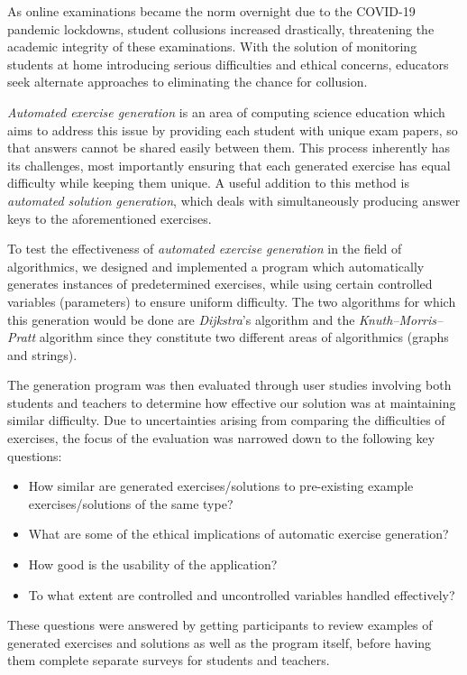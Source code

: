 \documentclass{l4proj}
\begin{document}
As online examinations became the norm overnight due to the COVID-19 pandemic lockdowns, student collusions increased drastically, threatening the academic integrity of these examinations. With the solution of monitoring students at home introducing serious difficulties and ethical concerns, educators seek alternate approaches to eliminating the chance for collusion.

\emph{Automated exercise generation} is an area of computing science education which aims to address this issue by providing each student with unique exam papers, so that answers cannot be shared easily between them. This process inherently has its challenges, most importantly ensuring that each generated exercise has equal difficulty while keeping them unique. A useful addition to this method is \emph{automated solution generation}, which deals with simultaneously producing answer keys to the aforementioned exercises.

To test the effectiveness of \emph{automated exercise generation} in the field of algorithmics, we designed and implemented a program which automatically generates instances of predetermined exercises, while using certain controlled variables (parameters) to ensure uniform difficulty. The two algorithms for which this generation would be done are \emph{Dijkstra}'s algorithm and the \emph{Knuth–Morris–Pratt} algorithm since they constitute two different areas of algorithmics (graphs and strings).

The generation program was then evaluated through user studies involving both students and teachers to determine how effective our solution was at maintaining similar difficulty. Due to uncertainties arising from comparing the difficulties of exercises, the focus of the evaluation was narrowed down to the following key questions:

\begin{itemize}
	\item
	How similar are generated exercises/solutions to pre-existing example exercises/solutions of the same type?
	\item
	What are some of the ethical implications of automatic exercise generation?
	\item
	How good is the usability of the application?
	\item
	To what extent are controlled and uncontrolled variables handled effectively?
\end{itemize}

These questions were answered by getting participants to review examples of generated exercises and solutions as well as the program itself, before having them complete separate surveys for students and teachers. 
\end{document}
